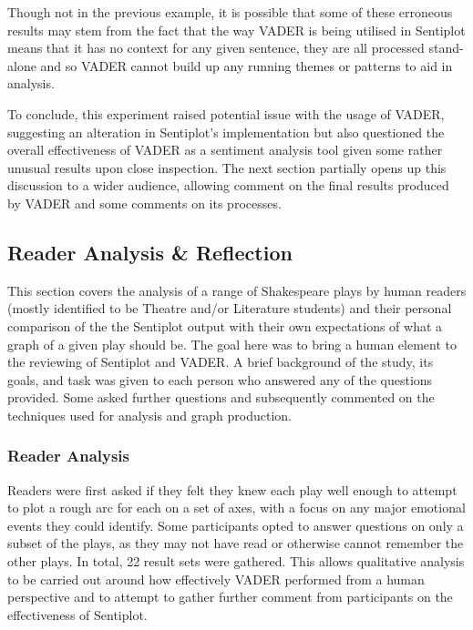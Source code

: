 \documentclass{article}
\begin{document}
{        Though not in the previous example, it is possible that some of these erroneous results may stem from the fact that the way VADER is being utilised in Sentiplot means that it has no context for any given sentence, they are all processed stand-alone and so VADER cannot build up any running themes or patterns to aid in analysis.

        To conclude, this experiment raised potential issue with the usage of VADER, suggesting an alteration in Sentiplot's implementation but also questioned the overall effectiveness of VADER as a sentiment analysis tool given some rather unusual results upon close inspection. The next section partially opens up this discussion to a wider audience, allowing comment on the final results produced by VADER and some comments on its processes.
    \subsection{Reader Analysis \& Reflection}
    \label{subsec:reader}
        This section covers the analysis of a range of Shakespeare plays by human readers (mostly identified to be Theatre and/or Literature students) and their personal comparison of the the Sentiplot output with their own expectations of what a graph of a given play should be. The goal here was to bring a human element to the reviewing of Sentiplot and VADER. A brief background of the study, its goals, and task was given to each person who answered any of the questions provided. Some asked further questions and subsequently commented on the techniques used for analysis and graph production.
        \subsubsection{Reader Analysis}
            Readers were first asked if they felt they knew each play well enough to attempt to plot a rough arc for each on a set of axes, with a focus on any major emotional events they could identify. Some participants opted to answer questions on only a subset of the plays, as they may not have read or otherwise cannot remember the other plays. In total, 22 result sets were gathered. This allows qualitative analysis to be carried out around how effectively VADER performed from a human perspective and to attempt to gather further comment from participants on the effectiveness of Sentiplot.

}
\end{document}
